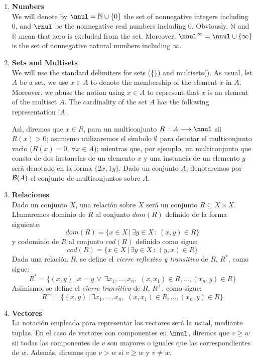 \begin{enumerate}
\item {\bf Numbers}\\
We will denote by $\nnul = \mathbb{N} \cup \{0\}$ the set of nonnegative integers including 0,
and $\rnul$ be the nonnegative real numbers including 0. Obviously, $\mathbb{N}$
and $\mathbb{R}$ mean that zero is excluded from the set. Moreover,
$\nnul^{\infty} = \nnul \cup \left\{\infty \right\}$ is the set of nonnegative natural numbers including $\infty$. 

\item {\bf Sets and Multisets}\\
We will use the standard delimiters for sets (\{\}) and multisets(\multiset{}). 
As usual, let $A$ be a set, we use $x \in A$ to denote the membership of the element  $x$ in $A$.
Moreover, we abuse the notion using $x \in A$ to represent that $x$ is an element of
the multiset $A$. The cardinality of the set $A$
has the following representation $|A|$.

As\'{\i}, diremos
que $x \in R$, para un multiconjunto $R\,:\,A \longrightarrow \nnul$
sii $R(x) > 0$; asimismo utilizaremos el s\'{\i}mbolo
$\emptyset$ para denotar el
multiconjunto vac\'{\i}o ($R(x)=0,\,\forall x \in A$); mientras que,
por ejemplo,
un multiconjunto que consta de dos
instancias de un elemento $x$ y una instancia de un elemento $y$
ser\'{a} denotado en la forma $\{2x,1y\}$. Dado un conjunto
$A$, denotaremos por ${\cal B}(A)$ el conjunto de multiconjuntos
sobre $A$.

\item {\bf Relaciones}\\
Dado un conjunto $X$, una relaci\'{o}n sobre
$X$ ser\'{a} un conjunto $R \subseteq X \times X$. Llamaremos
dominio de $R$ al conjunto $dom(R)$ definido de la forma
siguiente:
\[dom(R) = \{ x \in X \,|\, \exists
y \in X\,:\, (x,y) \in R \}\]
y codominio de $R$ al conjunto $cod(R)$ definido como sigue:
\[cod(R) = \{ x \in X \,|\, \exists y \in X\,:\,(y,x) \in R\}\]
Dada una relaci\'{o}n $R$, se define el {\it cierre reflexivo y transitivo} de
$R$, $R^*$, como sigue:
\[ R^* = \{ (x,y)\,|\,x=y \,\vee\,
\exists x_1,\ldots,x_n,\,\,(x,x_1)\in R,\ldots,(x_n,y) \in R\}\]
Asimismo, se define el {\it cierre
transitivo} de $R$, $R^+$, como sigue:
\[R^+ = \{ (x,y)\,|\,
\exists x_1,\ldots,x_n,\,\,(x,x_1)\in R,\ldots,(x_n,y) \in R\}\]
\item {\bf Vectores}\\
La notaci\'{o}n empleada para representar los vectores
ser\'{a} la usual, mediante tuplas. En el caso de vectores con componentes
en $\nnul$, diremos que $v \geq w$ sii todas las componentes de $v$
son mayores o iguales que las correspondientes de $w$. Adem\'{a}s,
diremos que $v > w$ si $v \geq w$ y $v \neq w$.
\end{enumerate}

